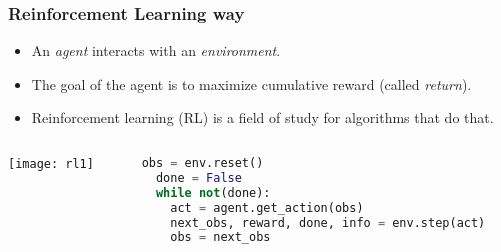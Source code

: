 \begin{frame}[fragile]\frametitle{Reinforcement Learning way}

\begin{itemize}
\item An \textit{agent} interacts with an \textit{environment}. 
\item The goal of the agent is to maximize cumulative reward (called \textit{return}). 
\item Reinforcement learning (RL) is a field of study for algorithms that do that.
\end{itemize}

\begin{columns}
\begin{column}{0.5\textwidth}
    \begin{center}
     \texttt{[image: rl1]}
     \end{center}
\end{column}
\begin{column}{0.5\textwidth}  %
\begin{lstlisting}[language=python]
  obs = env.reset()
  done = False
  while not(done):
  	act = agent.get_action(obs)
  	next_obs, reward, done, info = env.step(act)
  	obs = next_obs
\end{lstlisting}
\end{column}
\end{columns}

\end{frame}

